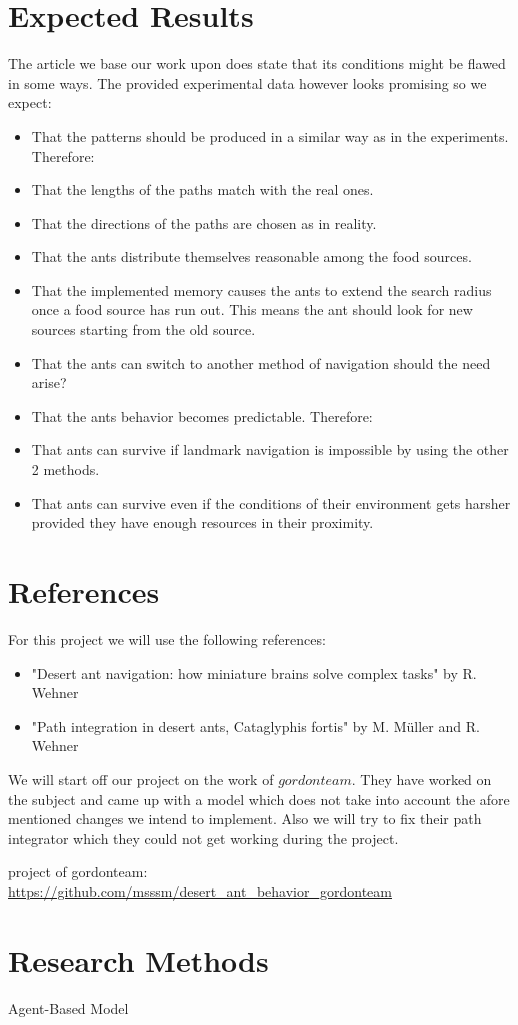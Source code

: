 \documentclass[11pt,a4paper]{scrartcl}
\begin{document}
\section*{Expected Results}

The article we base our work upon does state that its conditions might be flawed in some ways. The provided experimental data however looks promising so we expect:
\begin{itemize}
\item That the patterns should be produced in a similar way as in the experiments. Therefore:
\item That the lengths of the paths match with the real ones.
\item That the directions of the paths are chosen as in reality.
\item That the ants distribute themselves reasonable among the food sources.
\item That the implemented memory causes the ants to extend the search radius once a food source has run out. This means the ant should look for new sources starting from the old source.
\item That the ants can switch to another method of navigation should the need arise?
\item That the ants behavior becomes predictable. Therefore:
\item That ants can survive if landmark navigation is impossible by using the other 2 methods.
\item That ants can survive even if the conditions of their environment gets harsher provided they have enough resources in their proximity.
\end{itemize}

\section*{References }
For this project we will use the following references:
\begin{itemize}
\item "Desert ant navigation: how miniature brains solve complex tasks" by R. Wehner
\item "Path integration in desert ants, Cataglyphis fortis" by M. Müller and R. Wehner
\end{itemize}

We will start off our project on the work of $gordonteam$. They have worked on the subject and came up with a model which does not take into account the afore mentioned changes we intend to implement. Also we will try to fix their path integrator which they could not get working during the project.

project of gordonteam: \url{ https://github.com/msssm/desert_ant_behavior_gordonteam}




\section*{Research Methods}
Agent-Based Model
\end{document}
